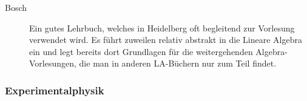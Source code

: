 \begin{description}
\item[Bosch]{
		Ein gutes Lehrbuch, welches in Heidelberg oft begleitend zur Vorlesung verwendet wird. Es führt zuweilen relativ abstrakt in die Lineare Algebra ein und legt bereits dort Grundlagen für die weitergehenden Algebra-Vorlesungen, die man in anderen LA-Büchern nur zum Teil findet.}

\end{description}

\subsubsection{Experimentalphysik}
